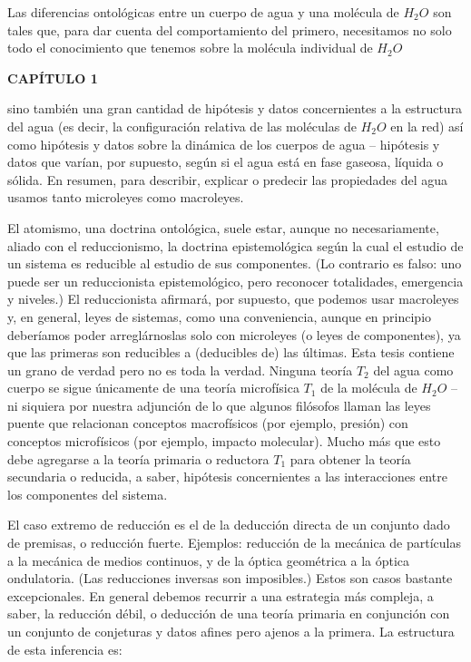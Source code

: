 {Las diferencias ontológicas entre un cuerpo de agua y una molécula de \( H_2O \) son tales que, 
para dar cuenta del comportamiento del primero, necesitamos no solo todo el conocimiento que tenemos sobre la molécula individual de \( H_2O \)
}

\newpage
\fancyhf{}
\fancyhead[l]{\thepage}
\begin{center}
{\fontsize{16}{18}\selectfont \textbf{CAPÍTULO 1}}
\end{center}
\vspace{0.5cm}

{\fontsize{13}{15}\selectfont
sino también una gran cantidad de hipótesis y datos concernientes a la estructura del agua (es decir, la configuración relativa de las moléculas de \( H_2O \) en la red) 
así como hipótesis y datos sobre la dinámica de los cuerpos de agua – hipótesis y datos que varían, por supuesto, según si el agua está en fase gaseosa, líquida o sólida. 
En resumen, para describir, explicar o predecir las propiedades del agua usamos tanto microleyes como macroleyes.

El atomismo, una doctrina ontológica, suele estar, aunque no necesariamente, aliado con el reduccionismo, la doctrina epistemológica según la cual el estudio de un sistema es reducible al estudio de sus componentes. 
(Lo contrario es falso: uno puede ser un reduccionista epistemológico, pero reconocer totalidades, emergencia y niveles.) El reduccionista afirmará, por supuesto, que podemos usar macroleyes y, 
en general, leyes de sistemas, como una conveniencia, aunque en principio deberíamos poder arreglárnoslas solo con microleyes (o leyes de componentes), ya que las primeras son reducibles a (deducibles de) las últimas. 
Esta tesis contiene un grano de verdad pero no es toda la verdad. Ninguna teoría \( T_2 \) del agua como cuerpo se sigue únicamente de una teoría microfísica \( T_1 \) de la molécula de \( H_2O \) – 
ni siquiera por nuestra adjunción de lo que algunos filósofos llaman las leyes puente que relacionan conceptos macrofísicos (por ejemplo, presión) con conceptos microfísicos (por ejemplo, impacto molecular). 
Mucho más que esto debe agregarse a la teoría primaria o reductora \( T_1 \) para obtener la teoría secundaria o reducida, a saber, hipótesis concernientes a las interacciones entre los componentes del sistema.

El caso extremo de reducción es el de la deducción directa de un conjunto dado de premisas, o reducción fuerte. Ejemplos: reducción de la mecánica de partículas a la mecánica de medios continuos, y de la óptica geométrica a la óptica ondulatoria. 
(Las reducciones inversas son imposibles.) Estos son casos bastante excepcionales. En general debemos recurrir a una estrategia más compleja, a saber, la reducción débil, o deducción de una teoría primaria en conjunción con un conjunto de conjeturas 
y datos afines pero ajenos a la primera. La estructura de esta inferencia es:

}
